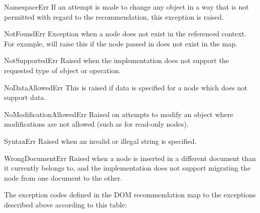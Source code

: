 \begin{excdesc}{NamespaceErr}
  If an attempt is made to change any object in a way that is not
  permitted with regard to the
  recommendation, this exception is raised.
\end{excdesc}

\begin{excdesc}{NotFoundErr}
  Exception when a node does not exist in the referenced context.  For
  example,  will raise this if
  the node passed in does not exist in the map.
\end{excdesc}

\begin{excdesc}{NotSupportedErr}
  Raised when the implementation does not support the requested type
  of object or operation.
\end{excdesc}

\begin{excdesc}{NoDataAllowedErr}
  This is raised if data is specified for a node which does not
  support data.
\end{excdesc}

\begin{excdesc}{NoModificationAllowedErr}
  Raised on attempts to modify an object where modifications are not
  allowed (such as for read-only nodes).
\end{excdesc}

\begin{excdesc}{SyntaxErr}
  Raised when an invalid or illegal string is specified.
\end{excdesc}

\begin{excdesc}{WrongDocumentErr}
  Raised when a node is inserted in a different document than it
  currently belongs to, and the implementation does not support
  migrating the node from one document to the other.
\end{excdesc}

The exception codes defined in the DOM recommendation map to the
exceptions described above according to this table:

